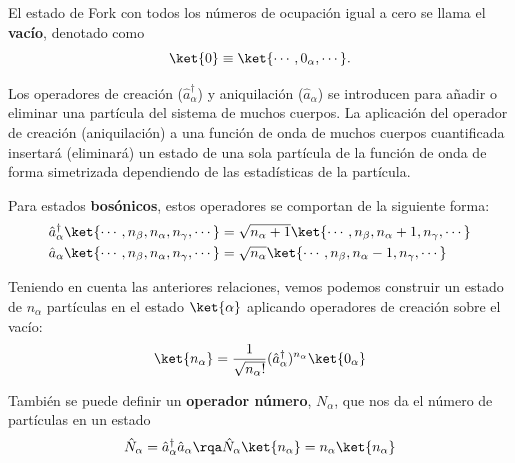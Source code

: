         El estado de Fork con todos los números de ocupación igual a cero se llama el \textbf{vacío}, denotado como 
        \begin{equation}
            \ket{0} \equiv \ket{\cdots, 0_\alpha, \cdots}.
        \end{equation} 



    
        Los operadores de creación ($\hat{a}^\dagger_\alpha$) y aniquilación ($\hat{a}_\alpha$) se introducen para añadir o eliminar una partícula del sistema de muchos cuerpos. La aplicación del operador de creación (aniquilación) a una función de onda de muchos cuerpos cuantificada insertará (eliminará) un estado de una sola partícula de la función de onda de forma simetrizada dependiendo de las estadísticas de la partícula.

        Para estados \textbf{bosónicos}, estos operadores se comportan de la siguiente forma:
        \begin{equation} \label{ec_sqc_a_y_a_dagger_sobre_n_generico}
            \begin{aligned}
                \hat{a}_\alpha^\dagger \ket{\cdots, n_\beta, n_\alpha, n_\gamma,\cdots } & = \sqrt{n_\alpha+1} \ket{\cdots, n_\beta, n_\alpha + 1, n_\gamma,\cdots } \\
                \hat{a}_\alpha \ket{\cdots, n_\beta, n_\alpha, n_\gamma,\cdots } & = \sqrt{n_\alpha} \ket{\cdots, n_\beta, n_\alpha - 1, n_\gamma,\cdots }
            \end{aligned}
        \end{equation}
    
        Teniendo en cuenta las anteriores relaciones, vemos podemos construir un estado de $n_\alpha$ partículas en el estado $\ket{\alpha}$ aplicando operadores de creación sobre el vacío:
        \begin{equation}
            \ket{n_\alpha} = \frac{1}{\sqrt{n_\alpha !}} (\hat{a}^\dagger_\alpha)^{n_\alpha} \ket{0_\alpha}
        \end{equation}
        
        También se puede definir un \textbf{operador número}, $N_\alpha$, que nos da el número de partículas en un estado
        \begin{equation}
            \hat{N}_\alpha = \hat{a}_\alpha^\dagger \hat{a}_\alpha \rqa \hat{N}_\alpha \ket{n_\alpha} = n_\alpha \ket{n_\alpha}
        \end{equation}




